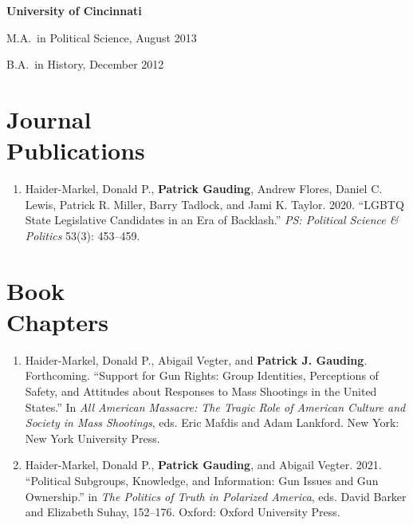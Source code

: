 \documentclass[margin,line,pifont,palatino,courier]{res}
\newenvironment{list1}{
  \begin{list}{\ding{113}}{%
      \setlength{\itemsep}{0in}
      \setlength{\parsep}{0in} \setlength{\parskip}{0in}
      \setlength{\topsep}{0in} \setlength{\partopsep}{0in}
      \setlength{\leftmargin}{0.17in}}}{\end{list}}
\newenvironment{list2}{
  \begin{list}{$\bullet$}{%
      \setlength{\itemsep}{0in}
      \setlength{\parsep}{0in} \setlength{\parskip}{0in}
      \setlength{\topsep}{0in} \setlength{\partopsep}{0in}
      \setlength{\leftmargin}{0.2in}}}{\end{list}}
\begin{document}
\begin{resume}
{\bf University of Cincinnati}\\
\begin{list1}
\item[] M.A.~in Political Science, August 2013
\item[] B.A.~in History, December 2012


\end{list1}

\section{\sc Journal \\Publications}

\begin{enumerate}

\item Haider-Markel, Donald P., \textbf{Patrick Gauding}, Andrew Flores,
Daniel C. Lewis, Patrick R. Miller, Barry Tadlock, and Jami
K. Taylor. 2020. ``LGBTQ State Legislative Candidates in an Era
of Backlash.'' \emph{PS: Political Science \& Politics} 53(3): 453--459.


\end{enumerate}

\section{\sc Book \\Chapters}

\begin{enumerate}

\item Haider-Markel, Donald P., Abigail Vegter, and \textbf{Patrick
    J. Gauding}. Forthcoming. ``Support for Gun Rights: Group
  Identities, Perceptions of Safety, and Attitudes about Responses to
  Mass Shootings in the United States.'' In \textit{All American
    Massacre: The Tragic Role of American Culture and Society in Mass
    Shootings}, eds. Eric Mafdis and Adam Lankford. New York: New York
  University Press.

\item Haider-Markel, Donald P., \textbf{Patrick Gauding}, and Abigail
  Vegter. 2021. ``Political Subgroups, Knowledge, and Information: Gun
  Issues and Gun Ownership.'' in \textit{The Politics of Truth in
    Polarized America}, eds. David Barker and Elizabeth Suhay,
  152--176. Oxford: Oxford University Press.


\end{enumerate}
\end{resume}
\end{document}

